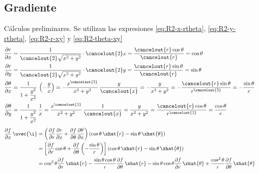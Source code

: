 \subsection{Gradiente}
Cálculos preliminares. Se utilizan las expresiones \eqref{eq:R2-x-rtheta},
\eqref{eq:R2-y-rtheta}, \eqref{eq:R2-r-xy} y \eqref{eq:R2-theta-xy}
{\small
\begin{subequations}
  \begin{align}
    \dfrac{\partial r}{\partial x}
    &=
      \dfrac{1}{\cancelout{2}\sqrt{x^2+y^2}}\cdot \cancelout{2}x
      = \dfrac{\cancelout{r}\cos\theta}{\cancelout{r}} = \cos\theta\\
    \dfrac{\partial r}{\partial y}
    &=
      \dfrac{1}{\cancelout{2}\sqrt{x^2+y^2}}\cdot \cancelout{2}y
      = \dfrac{\cancelout{r}\sin\theta}{\cancelout{r}} = \sin\theta\\
    \dfrac{\partial\theta}{\partial x}
    &=
      \dfrac{1}{1+\dfrac{y^2}{x^2}}\,\left(-\dfrac{y}{x}\right)
      = -\dfrac{x^{\cancelout{\scriptstyle{2}}}}{x^2+y^2}\,\dfrac{y}{\cancelout{x}}
      = -\dfrac{y}{x^2+y^2}
      = -\dfrac{\cancelout{r}\sin\theta}{r^{\cancelout{2}}}
      = -\dfrac{\sin\theta}{r}\\
    \dfrac{\partial\theta}{\partial y}
    &=
      \dfrac{1}{1+\dfrac{y^2}{x^2}}\,\dfrac{1}{x}
      = \dfrac{x^{\cancelout{\scriptstyle{2}}}}{x^2+y^2}\,\dfrac{1}{\cancelout{x}}
      = \dfrac{y}{x^2+y^2}
      = \dfrac{\cancelout{r}\cos\theta}{r^{\cancelout{\scriptstyle{2}}}}
      = \dfrac{\cos\theta}{r}
  \end{align}
\end{subequations}
}
{\small
  \begin{subequations}
    \begin{align*}
      \dfrac{\partial f}{\partial x}\,\uvec{\i}
      &=
        \left(%
        \dfrac{\partial f}{\partial r}\dfrac{\partial r}{\partial x}
        + \dfrac{\partial f}{\partial\theta}\dfrac{\partial\theta}{\partial x}
        \right)
        \left(%
        \cos\theta\,\xhat{r}-\sin\theta\,\xhat{\theta}
        \right)\\
      &=
        \left[%
        \dfrac{\partial f}{\partial r}\cos\theta
        + \dfrac{\partial f}{\partial\theta}\left(-\dfrac{\sin\theta}{r}\right)
        \right]
        \left(%
        \cos\theta\,\xhat{r} - \sin\theta\,\xhat{\theta}
        \right)\\
      &=
        \cos^2\theta\dfrac{\partial f}{\partial r}\,\xhat{r}
        -\dfrac{\sin\theta\cos\theta}{r}\dfrac{\partial f}{\partial\theta}\,\xhat{r}
        - \sin\theta\cos\theta\dfrac{\partial f}{\partial r}\,\xhat{\theta}
        + \dfrac{\cos^2\theta}{r}\dfrac{\partial f}{\partial\theta}\,\xhat{\theta}
    \end{align*}
  \end{subequations}
}
